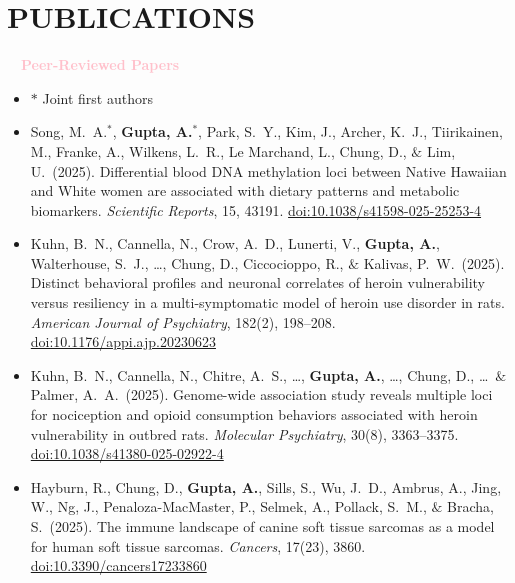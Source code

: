 \documentclass[11pt,a4paper,roman]{moderncv}        %
\begin{document}
\section{PUBLICATIONS}
\sloppy %
\vskip 0.3cm
\textbf{\textcolor{pink}{\large{$\quad$Peer-Reviewed Papers}}}
\vskip 0.2cm
\begin{itemize}
\item[] $*$ Joint first authors
\vskip 0.15cm
\item Song, M.\ A.$^*$, \textbf{Gupta, A.$^*$}, Park, S.\ Y., Kim, J., Archer, K.\ J., Tiirikainen, M., Franke, A., Wilkens, L.\ R., Le Marchand, L., Chung, D., $\&$ Lim, U.\ (2025). Differential blood DNA methylation loci between Native Hawaiian and White women are associated with dietary patterns and metabolic biomarkers. \textit{Scientific Reports}, 15, 43191. \href{https://doi.org/10.1038/s41598-025-25253-4}{doi:10.1038/s41598-025-25253-4}\par\vspace{5pt}
\item Kuhn, B.\ N., Cannella, N., Crow, A.\ D., Lunerti, V., \textbf{Gupta, A.}, Walterhouse, S.\ J., \ldots, Chung, D., Ciccocioppo, R., $\&$ Kalivas, P.\ W.\ (2025). Distinct behavioral profiles and neuronal correlates of heroin vulnerability versus resiliency in a multi-symptomatic model of heroin use disorder in rats. \textit{American Journal of Psychiatry}, 182(2), 198--208. \href{https://doi.org/10.1176/appi.ajp.20230623}{doi:10.1176/appi.ajp.20230623}\par\vspace{5pt}
\item Kuhn, B.\ N., Cannella, N., Chitre, A.\ S., \ldots, \textbf{Gupta, A.}, \ldots, Chung, D., \ldots\ $\&$ Palmer, A.\ A.\ (2025). Genome-wide association study reveals multiple loci for nociception and opioid consumption behaviors associated with heroin vulnerability in outbred rats. \textit{Molecular Psychiatry}, 30(8), 3363--3375. \href{https://doi.org/10.1038/s41380-025-02922-4}{doi:10.1038/s41380-025-02922-4}\par\vspace{5pt}
\item Hayburn, R., Chung, D., \textbf{Gupta, A.}, Sills, S., Wu, J.\ D., Ambrus, A., Jing, W., Ng, J., Penaloza-MacMaster, P., Selmek, A., Pollack, S.\ M., $\&$ Bracha, S.\ (2025). The immune landscape of canine soft tissue sarcomas as a model for human soft tissue sarcomas. \textit{Cancers}, 17(23), 3860. \href{https://doi.org/10.3390/cancers17233860}{doi:10.3390/cancers17233860}\par\vspace{5pt}

\end{itemize}
\end{document}
